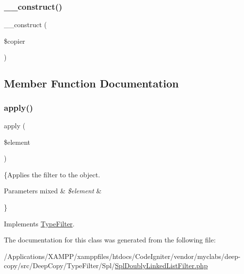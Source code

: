\subsubsection{\texorpdfstring{\+\_\+\+\_\+construct()}{\_\_construct()}}
{\footnotesize\ttfamily \+\_\+\+\_\+construct (\begin{DoxyParamCaption}\item[{\mbox{\hyperlink{class_deep_copy_1_1_deep_copy}{Deep\+Copy}}}]{\$copier }\end{DoxyParamCaption})}



\subsection{Member Function Documentation}
\mbox{\label{class_deep_copy_1_1_type_filter_1_1_spl_1_1_spl_doubly_linked_list_filter_a959e75f8f2b305dcf33633745c338176}} 
\subsubsection{\texorpdfstring{apply()}{apply()}}
{\footnotesize\ttfamily apply (\begin{DoxyParamCaption}\item[{}]{\$element }\end{DoxyParamCaption})}

\{Applies the filter to the object.


\begin{DoxyParams}[1]{Parameters}
mixed & {\em \$element} & \\
\hline
\end{DoxyParams}
\} 

Implements \mbox{\hyperlink{interface_deep_copy_1_1_type_filter_1_1_type_filter_a959e75f8f2b305dcf33633745c338176}{Type\+Filter}}.



The documentation for this class was generated from the following file\+:\begin{DoxyCompactItemize}
\item 
/\+Applications/\+X\+A\+M\+P\+P/xamppfiles/htdocs/\+Code\+Igniter/vendor/myclabs/deep-\/copy/src/\+Deep\+Copy/\+Type\+Filter/\+Spl/\mbox{\hyperlink{_spl_doubly_linked_list_filter_8php}{Spl\+Doubly\+Linked\+List\+Filter.\+php}}\end{DoxyCompactItemize}
